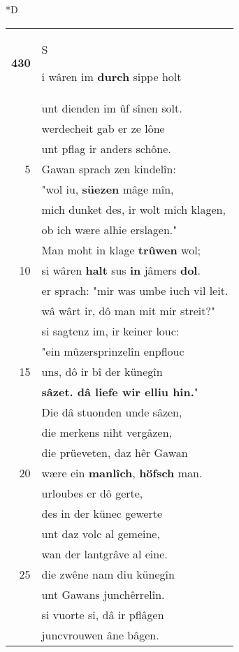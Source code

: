 \documentclass[8pt,a4paper,notitlepage]{article}
\begin{document}
\begin{table}[ht]
\begin{minipage}[t]{0.5\linewidth}
\small
\begin{center}*D
\end{center}
\begin{tabular}{rl}
\textbf{430} & \begin{large}S\end{large}i wâren im \textbf{durch} sippe holt\\ 
 & unt dienden im ûf sînen solt.\\ 
 & werdecheit gab er ze lône\\ 
 & unt pflag ir anders schône.\\ 
5 & Gawan sprach zen kindelîn:\\ 
 & "wol iu, \textbf{süezen} mâge mîn,\\ 
 & mich dunket des, ir wolt mich klagen,\\ 
 & ob ich wære alhie erslagen."\\ 
 & Man moht in klage \textbf{trûwen} wol;\\ 
10 & si wâren \textbf{halt} sus \textbf{in} jâmers \textbf{dol}.\\ 
 & er sprach: "mir was umbe iuch vil leit.\\ 
 & wâ wârt ir, dô man mit mir streit?"\\ 
 & si sagtenz im, ir keiner louc:\\ 
 & "ein mûzersprinzelîn enpflouc\\ 
15 & uns, dô ir bî der künegîn\\ 
 & \textbf{sâzet. dâ liefe wir elliu hin.}"\\ 
 & Die dâ stuonden unde sâzen,\\ 
 & die merkens niht vergâzen,\\ 
 & die prüeveten, daz hêr Gawan\\ 
20 & wære ein \textbf{manlîch}, \textbf{höfsch} man.\\ 
 & urloubes er dô gerte,\\ 
 & des in der künec gewerte\\ 
 & unt daz volc al gemeine,\\ 
 & wan der lantgrâve al eine.\\ 
25 & die zwêne nam diu künegîn\\ 
 & unt Gawans junchêrrelîn.\\ 
 & si vuorte si, dâ ir pflâgen\\ 
 & juncvrouwen âne bâgen.\\ 

\end{tabular}
\end{minipage}
\end{table}
\end{document}
